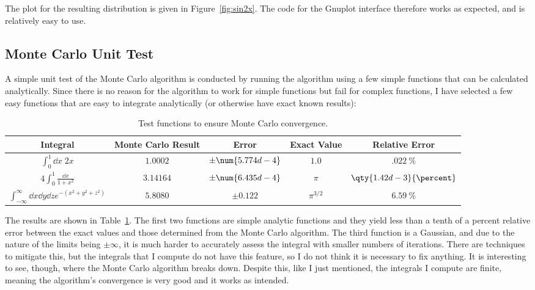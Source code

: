 The plot for the resulting distribution is given in Figure~\ref{fig:sin2x}. The code for the Gnuplot interface therefore works as expected, and is relatively easy to use.





\subsection{Monte Carlo Unit Test}

A simple unit test of the Monte Carlo algorithm is conducted by running the algorithm using a few simple functions that can be calculated analytically. Since there is no reason for the algorithm to work for simple functions but fail for complex functions, I have selected a few easy functions that are easy to integrate analytically (or otherwise have exact known results):

\renewcommand{\arraystretch}{1.5}
\begin{table}[ht]
  \centering
  \begin{tabular}{|c|c|c|c|c|}
    \hline
    Integral & Monte Carlo Result & Error & Exact Value & Relative Error \\ \hline
    $\int_0^1\dd x \; 2x$ & $1.0002$ & $\pm \num{5.774d-4}$ & $1.0$ & $\qty{.022}{\percent}$ \\ \hline
    $4\int_0^1 \frac{\dd x}{1+x^2}$ & $3.14164$ & $\pm \num{6.435d-4}$ & $\pi$ & $\qty{1.42d-3}{\percent}$ \\ \hline
    $\int_{-\infty}^\infty \dd x\dd y\dd z e^{-(x^2+y^2+z^2)}$ & $5.8080$ & $\pm 0.122$ & $\pi^{3/2}$ & $\qty{6.59}{\percent}$ \\ \hline
  \end{tabular}
  \caption{Test functions to ensure Monte Carlo convergence.}
  \label{tbl:monte-carlo-tests}
\end{table}
\renewcommand{\arraystretch}{1.0}

The results are shown in Table~\ref{tbl:monte-carlo-tests}. The first two functions are simple analytic functions and they yield less than a tenth of a percent relative error between the exact values and those determined from the Monte Carlo algorithm. The third function is a Gaussian, and due to the nature of the limits being $\pm\infty$, it is much harder to accurately assess the integral with smaller numbers of iterations. There are techniques to mitigate this, but the integrals that I compute do not have this feature, so I do not think it is necessary to fix anything. It is interesting to see, though, where the Monte Carlo algorithm breaks down. Despite this, like I just mentioned, the integrals I compute are finite, meaning the algorithm's convergence is very good and it works as intended.


